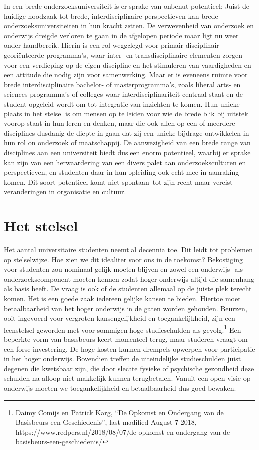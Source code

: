 \documentclass{jote-book}
\begin{document}
	In een brede onderzoeksuniversiteit is er sprake van onbenut potentieel: Juist de huidige noodzaak tot brede, interdisciplinaire perspectieven kan brede onderzoeksuniversiteiten in hun kracht zetten. De verwevenheid van onderzoek en onderwijs dreigde verloren te gaan in de afgelopen periode maar ligt nu weer onder handbereik. Hierin is een rol weggelegd voor primair disciplinair georiënteerde programma's, waar inter- en transdisciplinaire elementen zorgen voor een verdieping op de eigen discipline en het stimuleren van vaardigheden en een attitude die nodig zijn voor samenwerking. Maar er is eveneens ruimte voor brede interdisciplinaire bachelor- of masterprogramma's, zoals liberal arts- en sciences programma's of colleges waar interdisciplinariteit centraal staat en de student opgeleid wordt om tot integratie van inzichten te komen. Hun unieke plaats in het stelsel is om mensen op te leiden voor wie de brede blik bij uitstek voorop staat in hun leren en denken, maar die ook allen op een of meerdere disciplines dusdanig de diepte in gaan dat zij een unieke bijdrage ontwikkelen in hun rol on onderzoek of maatschappij. De aanwezigheid van een brede range van disciplines aan een universiteit biedt dus een enorm potentieel, waarbij er sprake kan zijn van een herwaardering van een divers palet aan onderzoeksculturen en perspectieven, en studenten daar in hun opleiding ook echt mee in aanraking komen. Dit soort potentieel komt niet spontaan tot zijn recht maar vereist veranderingen in organisatie en cultuur.



	\section{Het stelsel}



	Het aantal universitaire studenten neemt al decennia toe. Dit leidt tot problemen op stelselwijze. Hoe zien we dit idealiter voor ons in de toekomst? Bekostiging voor studenten zou nominaal gelijk moeten blijven en zowel een onderwijs- als onderzoekscomponent moeten kennen zodat hoger onderwijs altijd die samenhang als basis heeft. De vraag is ook of de studenten allemaal op de juiste plek terecht komen. Het is een goede zaak iedereen gelijke kansen te bieden. Hiertoe moet betaalbaarheid van het hoger onderwijs in de gaten worden gehouden. Beurzen, ooit ingevoerd voor vergroten kansengelijkheid en toegankelijkheid, zijn een leenstelsel geworden met voor sommigen hoge studieschulden als gevolg.\footnote{Daimy Comijs en Patrick Karg, “De Opkomst en Ondergang van de Basisbeurs een Geschiedenis”, last modified August 7 2018, https://www.redpers.nl/2018/08/07/de-opkomst-en-ondergang-van-de-basisbeurs-een-geschiedenis/} Een beperkte vorm van basisbeurs keert momenteel terug, maar studeren vraagt om een forse investering. De hoge kosten kunnen drempels opwerpen voor participatie in het hoger onderwijs. Bovendien treffen de uiteindelijke studieschulden juist degenen die kwetsbaar zijn, die door slechte fysieke of psychische gezondheid deze schulden na afloop niet makkelijk kunnen terugbetalen. Vanuit een open visie op onderwijs moeten we toegankelijkheid en betaalbaarheid dus goed bewaken.
\end{document}
